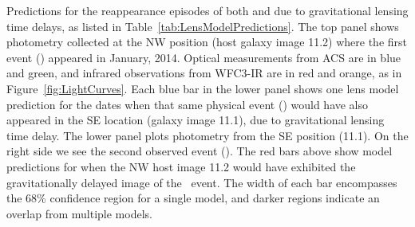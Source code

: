 \label{fig:SpockDelayPredictions}
Predictions for the reappearance episodes of both \spockone
and \spocktwo due to gravitational lensing time delays, as listed in
Table~\ref{tab:LensModelPredictions}.  The top panel shows photometry
collected at the NW position (host galaxy image 11.2) where the first
event (\spockone) appeared in January, 2014.  Optical
measurements from ACS are in blue and green, and infrared observations
from WFC3-IR are in red and orange, as in
Figure~\ref{fig:LightCurves}.  Each blue bar in the lower panel shows
one lens model prediction for the dates when that same physical event
(\spockone) would have also appeared in the SE location (galaxy image
11.1), due to gravitational lensing time delay.  The lower panel plots
photometry from the SE position (11.1). On the right side we see the
second observed event (\spocktwo).  The red bars above
show model predictions for when the NW host image 11.2 would have
exhibited the gravitationally delayed image of the \spocktwo\ event.
The width of each bar encompasses the 68\% confidence region for a
single model, and darker regions indicate an overlap from multiple
models.
  
